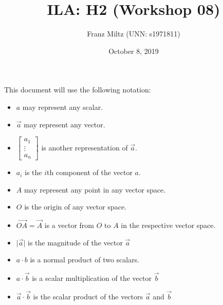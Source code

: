 \documentclass{article}
\title{ILA: H2 (Workshop 08)}
\author{Franz Miltz (UNN: s1971811)}
\date{October 8, 2019}
\begin{document}
\maketitle
This document will use the following notation:
\begin{itemize}
    \item $a$ may represent any scalar.
    \item $\vec{a}$ may represent any vector.
    \item $\begin{bmatrix}
        a_1\\
        \vdots\\
        a_n
    \end{bmatrix}$ is another representation of $\vec a$. 
    \item $a_i$ is the $i$th component of the vector $a$.
    \item $A$ may represent any point in any vector space.
    \item $O$ is the origin of any vector space.
    \item $\vec{OA}=\vec{A}$ is a vector from $O$ to $A$ in the respective vector space.
    \item $\vert\vec{a}\vert$ is the magnitude of the vector $\vec{a}$
    \item $a\cdot b$ is a normal product of two scalars.
    \item $a\cdot\vec{b}$ is a scalar multiplication of the vector $\vec{b}$
    \item $\vec{a}\cdot\vec{b}$ is the scalar product of the vectors $\vec{a}$ and $\vec{b}$
\end{itemize}
\end{document}
